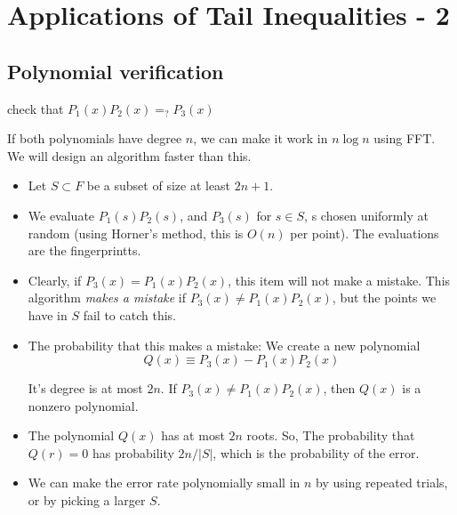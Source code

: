 \chapter{Applications of Tail Inequalities - 2}


\section{Polynomial verification}
check that $P_1(x) P_2(x) =_? P_3(x)$

If both polynomials have degree $n$, we can make it work in $n \log n$ using
FFT. We will design an algorithm faster than this.


\begin{itemize}
    \item Let $S \subset F$ be a subset of size at least $2n + 1$.
    \item We evaluate $P_1(s) P_2(s)$, and $P_3(s)$ for $s \in S$, s chosen uniformly
    at random (using Horner's method, this is $O(n)$ per point). The evaluations
    are the fingerprintts.
    
    \item Clearly, if $P_3(x) = P_1(x) P_2(x)$, this item will not make a
    mistake. This algorithm \textit{makes a mistake} if $P_3(x) \neq P_1(x) P_2(x)$, but the
    points we have in $S$ fail to catch this.
    \item The probability that this makes a mistake: We create a new polynomial
    $$Q(x) \equiv P_3(x) - P_1(x) P_2(x)$$
    
    It's degree is at most $2n$. If $P_3(x) \neq P_1(x) P_2(x)$, then $Q(x)$ is a
    nonzero polynomial.

    \item The polynomial $Q(x)$ has at most $2n$ roots. So, The probability
    that $Q(r) = 0$ has probability $2n/|S|$, which is the probability of the
    error.

    \item We can make the error rate polynomially small in $n$ by using
    repeated trials, or by picking a larger $S$.
\end{itemize}

